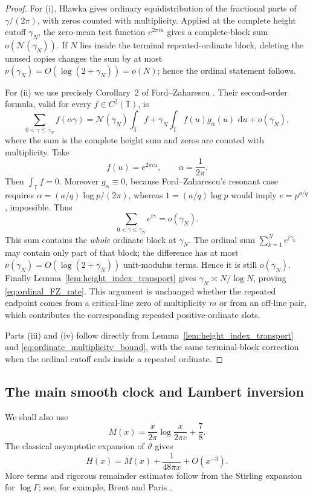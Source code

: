 \documentclass[11pt]{amsart}
\numberwithin{equation}{section}
\theoremstyle{definition}
\theoremstyle{remark}
\newcommand{\dd}{\,\mathrm d}
\begin{document}
\begin{proof}
For (i), Hlawka gives ordinary equidistribution of the fractional parts of \(\gamma/(2\pi)\), with zeros counted with multiplicity. Applied at the complete height cutoff \(\gamma_N\), the zero-mean test function \(e^{2\pi iu}\) gives a complete-block sum \(o(\mathcal N(\gamma_N))\). If \(N\) lies inside the terminal repeated-ordinate block, deleting the unused copies changes the sum by at most \(\nu(\gamma_N)=O(\log(2+\gamma_N))=o(N)\); hence the ordinal statement follows.

For (ii) we use precisely Corollary~2 of Ford--Zaharescu \cite{FordZaharescu2005}. Their second-order formula, valid for every \(f\in C^2(\mathbb T)\), is
\[
\sum_{0<\gamma\le \gamma_N} f(\alpha\gamma)
=\mathcal N(\gamma_N)\int_{\mathbb T}f
+\gamma_N\int_{\mathbb T} f(u)g_\alpha(u)\,\dd u
+o(\gamma_N),
\]
where the sum is the complete height sum and zeros are counted with multiplicity. Take
\[
f(u)=e^{2\pi iu},\qquad \alpha=\frac1{2\pi}.
\]
Then \(\int_{\mathbb T}f=0\). Moreover \(g_\alpha\equiv0\), because Ford--Zaharescu's resonant case requires \(\alpha=(a/q)\log p/(2\pi)\), whereas \(1=(a/q)\log p\) would imply \(e=p^{a/q}\), impossible. Thus
\begin{equation}\label{eq:FZ_complete_endpoint}
\sum_{0<\gamma\le\gamma_N}e^{i\gamma}=o(\gamma_N).
\end{equation}
This sum contains the \emph{whole} ordinate block at \(\gamma_N\). The ordinal sum \(\sum_{k=1}^N e^{i\gamma_k}\) may contain only part of that block; the difference has at most \(\nu(\gamma_N)=O(\log(2+\gamma_N))\) unit-modulus terms. Hence it is still \(o(\gamma_N)\). Finally Lemma~\ref{lem:height_index_transport} gives \(\gamma_N\asymp N/\log N\), proving \eqref{eq:ordinal_FZ_rate}. This argument is unchanged whether the repeated endpoint comes from a critical-line zero of multiplicity \(m\) or from an off-line pair, which contributes the corresponding repeated positive-ordinate slots.

Parts (iii) and (iv) follow directly from Lemma~\ref{lem:height_index_transport} and \eqref{eq:ordinate_multiplicity_bound}, with the same terminal-block correction when the ordinal cutoff ends inside a repeated ordinate.
\end{proof}

\subsection{The main smooth clock and Lambert inversion}
We shall also use
\begin{equation}\label{eq:Mclock}
M(x)=\frac{x}{2\pi}\log\frac{x}{2\pi e}+\frac78.
\end{equation}
The classical asymptotic expansion of $\vartheta$ gives
\begin{equation}\label{eq:HminusM}
H(x)=M(x)+\frac{1}{48\pi x}+O(x^{-3}).
\end{equation}
More terms and rigorous remainder estimates follow from the Stirling expansion for $\log\Gamma$; see, for example, Brent and Paris \cite{Brent2018,Paris2020}.
\end{document}
